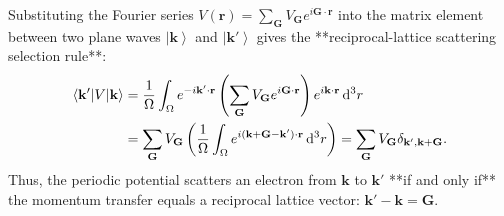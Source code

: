 \documentclass[11pt,a4paper]{article}
\newcommand{\ket}[1]{\left|#1\right\rangle}
\newcommand{\mel}[3]{\left\langle #1 \middle| #2 \middle| #3 \right\rangle}
\newcommand{\dd}{\mathrm{d}}
\newcommand{\kk}{\mathbf{k}}
\newcommand{\kpvec}{\mathbf{k}'}
\newcommand{\GG}{\mathbf{G}}
\newcommand{\rvec}{\mathbf{r}}
\begin{document}
Substituting the Fourier series $V(\rvec) = \sum_{\GG} V_{\GG} e^{i\GG\cdot\rvec}$ into the matrix element between two plane waves $\ket{\kk}$ and $\ket{\kpvec}$ gives the **reciprocal-lattice scattering selection rule**:
\begin{align}
    \mel{\kpvec}{V}{\kk} &= \frac{1}{\Omega}\int_{\Omega} e^{-i\kpvec\cdot\rvec} \left( \sum_{\GG} V_{\GG} e^{i\GG\cdot\rvec} \right) e^{i\kk\cdot\rvec}\,\dd^3 r \notag\\
    &= \sum_{\GG} V_{\GG} \left( \frac{1}{\Omega}\int_{\Omega} e^{i(\kk + \GG - \kpvec)\cdot\rvec}\,\dd^3 r \right) = \sum_{\GG} V_{\GG} \delta_{\kpvec, \kk+\GG}.
    \label{eq:nfe_selection_rule}
\end{align}
Thus, the periodic potential scatters an electron from $\kk$ to $\kpvec$ **if and only if** the momentum transfer equals a reciprocal lattice vector: $\kpvec - \kk = \GG$.
\end{document}
